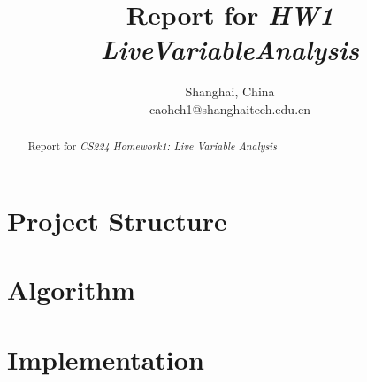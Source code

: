 \documentclass[conference]{IEEEtran}
\begin{document}
\title{Report for \textit{HW1 LiveVariableAnalysis}}


\author{
Shanghai, China\\
caohch1@shanghaitech.edu.cn}


\maketitle
\begin{abstract}
    Report for \textit{CS224 Homework1: Live Variable Analysis}
\end{abstract}
\section{Project Structure}

\section{Algorithm}

\section{Implementation}


% 
% 
\end{document}
